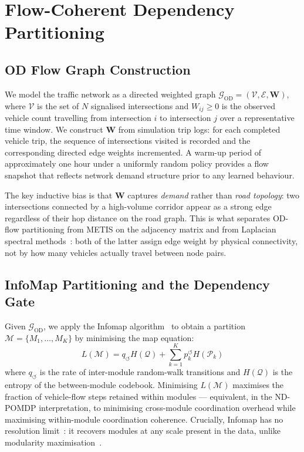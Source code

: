 \documentclass{article}
\begin{document}
\section{Flow-Coherent Dependency Partitioning}
\label{sec:method}

\subsection{OD Flow Graph Construction}
\label{sec:odgraph}

We model the traffic network as a directed weighted graph
$\mathcal{G}_{\mathrm{OD}} = (\mathcal{V}, \mathcal{E}, \mathbf{W})$,
where $\mathcal{V}$ is the set of $N$ signalised intersections and $W_{ij} \geq 0$
is the observed vehicle count travelling from intersection $i$ to intersection $j$
over a representative time window.
We construct $\mathbf{W}$ from simulation trip logs: for each completed vehicle
trip, the sequence of intersections visited is recorded and the corresponding
directed edge weights incremented.
A warm-up period of approximately one hour under a uniformly random policy provides
a flow snapshot that reflects network demand structure prior to any learned behaviour.

The key inductive bias is that $\mathbf{W}$ captures \emph{demand} rather than
\emph{road topology}: two intersections connected by a high-volume corridor appear
as a strong edge regardless of their hop distance on the road graph.
This is what separates OD-flow partitioning from METIS on the adjacency matrix
and from Laplacian spectral methods~\citep{laplacian2009ieee}: both of the latter
assign edge weight by physical connectivity, not by how many vehicles actually
travel between node pairs.

\subsection{InfoMap Partitioning and the Dependency Gate}
\label{sec:infomap}

Given $\mathcal{G}_{\mathrm{OD}}$, we apply the Infomap
algorithm~\citep{rosvall2008maps,rosvall2009mapequation} to obtain a partition
$\mathcal{M} = \{M_1, \ldots, M_K\}$ by minimising the map equation:
\begin{equation}
    L(\mathcal{M})
    = q_{\circlearrowleft} H(\mathcal{Q})
    + \sum_{k=1}^{K} p_k^{\circlearrowleft} H(\mathcal{P}_k)
    \label{eq:mapequation}
\end{equation}
where $q_{\circlearrowleft}$ is the rate of inter-module random-walk transitions
and $H(\mathcal{Q})$ is the entropy of the between-module codebook.
Minimising $L(\mathcal{M})$ maximises the fraction of vehicle-flow steps retained
within modules — equivalent, in the ND-POMDP interpretation, to minimising
cross-module coordination overhead while maximising within-module coordination
coherence.
Crucially, Infomap has no resolution limit~\citep{edler2023community}: it recovers
modules at any scale present in the data, unlike modularity
maximisation~\citep{newmangirvan2004}.
\end{document}
